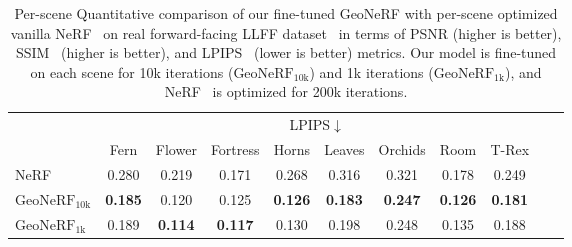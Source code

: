 \begin{table}[!t]
    \begin{center}
        \begin{threeparttable}
            \begin{tabular}{l|cccccccccc}
            & \multicolumn{8}{c}{LPIPS$\downarrow$} \\
            &  Fern & Flower & Fortress & Horns & Leaves & Orchids & Room & T-Rex \\
            \hline
            NeRF & 0.280 & 0.219 & 0.171 & 0.268 & 0.316 & 0.321 & 0.178 & 0.249 \\
            $\text{GeoNeRF}_{\text{10k}}$ & \textbf{0.185} & 0.120 & 0.125 & \textbf{0.126} & \textbf{0.183} & \textbf{0.247} & \textbf{0.126} & \textbf{0.181} \\
            $\text{GeoNeRF}_{\text{1k}}$ & 0.189 & \textbf{0.114} & \textbf{0.117} & 0.130 & 0.198 & 0.248 & 0.135 & 0.188 \\            
            \hline
            \end{tabular}
        \end{threeparttable}
    \end{center}
    \vspace{3.0ex}
    \caption{Per-scene Quantitative comparison of our fine-tuned GeoNeRF with per-scene optimized vanilla NeRF~\cite{mildenhall2020nerf} on real forward-facing LLFF dataset~\cite{mildenhall2019llff} in terms of PSNR (higher is better), SSIM~\cite{wang2004image} (higher is better), and LPIPS~\cite{zhang2018unreasonable} (lower is better) metrics. Our model is fine-tuned on each scene for 10k iterations ($\text{GeoNeRF}_{\text{10k}}$) and 1k iterations ($\text{GeoNeRF}_{\text{1k}}$), and NeRF~\cite{mildenhall2020nerf} is optimized for 200k iterations.}
    \label{table:per_scene_ft_llff}
\end{table}


\clearpage

